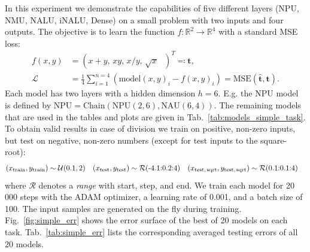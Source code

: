 \documentclass[9pt]{article}
\newcommand{\npu}{\text{NPU}}
\newcommand{\nau}{\text{NAU}}
\newcommand{\chain}{\text{Chain}}
\begin{document}
In this experiment we demonstrate the capabilities of five different
layers (NPU, NMU, NALU, iNALU, Dense) on a small problem with two inputs
and four outputs. The objective is to learn the function $f: \mathbb{R}^2
\rightarrow \mathbb{R}^4$ with a standard MSE loss:
\begin{align}
  \label{eq:simple_f}
  f(x,y) &= (x+y,\, xy,\, x/y,\, \sqrt{x} \text{  })^T \eqqcolon \bm t, \\
  \mathcal L &= \frac{1}{4} \sum_{i=1}^{n=4}\left(\text{model}(x,y)_i - f(x,y)_i\right)
             = \text{MSE}(\bm{\hat t}, \bm t).
\end{align}
Each model has two layers with a hidden dimension $h=6$.  E.g. the NPU model is
defined by $\npu=\chain(\npu(2,6),\nau(6,4))$.  The remaining models that are
used in the tables and plots are given in Tab.~\ref{tab:models_simple_task}.
To obtain valid results in case of division we train on positive, non-zero
inputs, but test on negative, non-zero numbers (except for test inputs to the
square-root):
\begin{align}
  \label{eq:simple_train}
  (x_{\text{train}}, y_{\text{train}}) &\sim \mathcal{U}(0.1,2) &
  (x_{\text{test}}, y_{\text{test}}) &\sim \mathcal{R}(\text{-4.1:0.2:4}) &
  (x_{\text{test,\,sqrt}}, y_{\text{test,\,sqrt}}) &\sim \mathcal{R}(\text{0.1:0.1:4})
\end{align}
where $\mathcal{R}$ denotes a \emph{range} with start, step, and end.
We train each model for 20\,000 steps with the ADAM optimizer, a learning rate of
0.001, and a batch size of 100. The input samples are generated on the fly
during training. Fig.~\ref{fig:simple_err} shows the error surface of the best
of 20 models on each task. Tab.~\ref{tab:simple_err} lists the corresponding
averaged testing errors of all 20 models.
\end{document}
